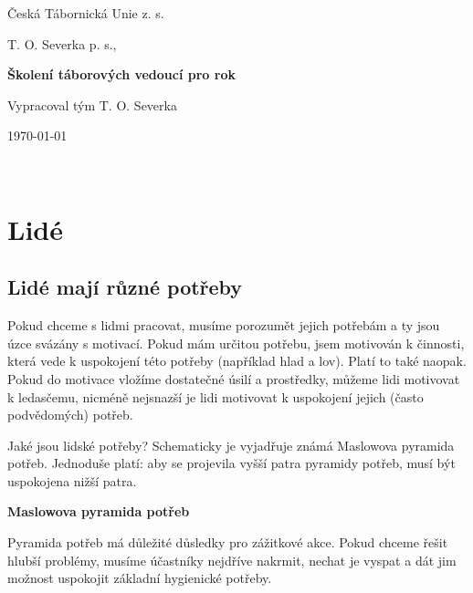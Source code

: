 \documentclass[a4paper,12pt]{report}
\begin{document}
\author{Daniel Adámek}
\begin{titlepage}

\mainpagelogo

\centering 
        \Large{Česká Tábornická Unie z. s.}
        \vspace{0.5cm}
        
        \Large{T. O. Severka p. s.,}
        \vspace{7.5cm}
        
        \Huge
        \textbf{Školení táborových vedoucí pro rok \the\year{}}
            
        \vspace{1.5cm}
            
        \large{Vypracoval tým T. O. Severka}
            
        \vfill
        \today

        \vspace{0.8cm}
\end{titlepage}

\pagebreak

\newpage

\ \thispagestyle{empty}

\newpage

\tableofcontents
\pagelogos
\pagebreak

\chapter{Lidé}\pagelogos
\section{Lidé mají různé potřeby}
Pokud chceme s lidmi pracovat, musíme porozumět jejich potřebám a ty jsou úzce svázány s motivací. Pokud mám určitou potřebu, jsem motivován k činnosti, která vede k uspokojení této potřeby (například hlad a lov). Platí to také naopak.
Pokud do motivace vložíme dostatečné úsilí a prostředky, můžeme lidi motivovat k ledasčemu, nicméně nejsnazší je lidi motivovat k uspokojení jejich (často podvědomých) potřeb.

Jaké jsou lidské potřeby? Schematicky je vyjadřuje známá Maslowova pyramida potřeb. Jednoduše platí: aby se projevila vyšší patra pyramidy potřeb, musí být uspokojena nižší patra.

\begin{flushleft}
\textbf{Maslowova pyramida potřeb}
\end{flushleft}
Pyramida potřeb má důležité důsledky pro zážitkové akce. Pokud chceme řešit hlubší problémy, musíme účastníky nejdříve nakrmit, nechat je vyspat a dát jim možnost uspokojit základní hygienické potřeby.
\end{document}
